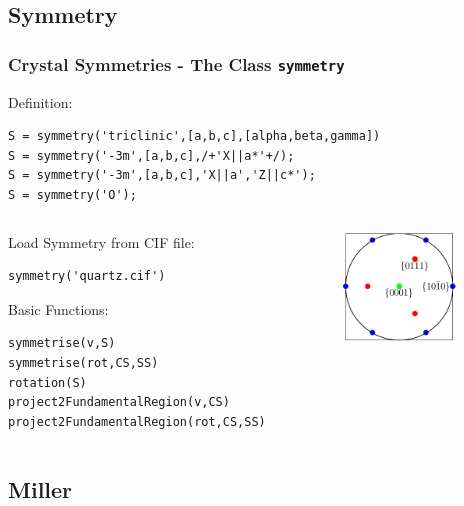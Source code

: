 \subsection*{Symmetry}
\begin{frame}[fragile]
  \frametitle{Crystal Symmetries - The \MTEX Class \texttt{\bf symmetry}}

  Definition:

\begin{lstlisting}
S = symmetry('triclinic',[a,b,c],[alpha,beta,gamma])
S = symmetry('-3m',[a,b,c],/+'X||a*'+/);
S = symmetry('-3m',[a,b,c],'X||a','Z||c*');
S = symmetry('O');
\end{lstlisting}

\medskip

\begin{columns}
  \begin{column}{8.5cm}

Load Symmetry from CIF file:

\begin{lstlisting}
symmetry('quartz.cif')
\end{lstlisting}

\medskip

    Basic Functions:

\begin{lstlisting}
symmetrise(v,S)
symmetrise(rot,CS,SS)
rotation(S)
project2FundamentalRegion(v,CS)
project2FundamentalRegion(rot,CS,SS)
\end{lstlisting}
  \end{column}

  \begin{column}{3cm}
    \includegraphics[width=3cm]{pic/sym}
  \end{column}

\end{columns}

\end{frame}

\subsection*{Miller}

